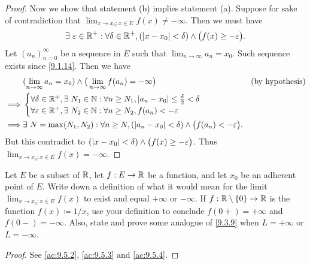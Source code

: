 \begin{proof}
  Now we show that statement (b) implies statement (a).
  Suppose for sake of contradiction that \(\lim_{x \to x_0 ; x \in E} f(x) \neq -\infty\).
  Then we must have
  \[
    \exists\ \varepsilon \in \mathbb{R}^+ : \forall \delta \in \mathbb{R}^+, (\left\lvert x - x_0\right\rvert < \delta) \land \big(f(x) \geq -\varepsilon\big).
  \]
  Let \((a_n)_{n = 0}^\infty\) be a sequence in \(E\) such that \(\lim_{n \to \infty} a_n = x_0\).
  Such sequence exists since \cref{9.1.14}.
  Then we have
  \begin{align*}
             & (\lim_{n \to \infty} a_n = x_0) \land \big(\lim_{n \to \infty} f(a_n) = -\infty\big)                                 & \text{(by hypothesis)} \\
    \implies & \begin{cases}
                 \forall \delta \in \mathbb{R}^+, \exists\ N_1 \in \mathbb{N} : \forall n \geq N_1, \left\lvert a_n - x_0\right\rvert \leq \frac{\delta}{2} < \delta \\
                 \forall \varepsilon \in \mathbb{R}^+, \exists\ N_2 \in \mathbb{N} : \forall n \geq N_2, f(a_n) < -\varepsilon
               \end{cases}                             \\
    \implies & \exists\ N = \max(N_1, N_2) : \forall n \geq N, (\left\lvert a_n - x_0\right\rvert < \delta) \land \big(f(a_n) < -\varepsilon\big).
  \end{align*}
  But this contradict to \((\left\lvert x - x_0\right\rvert < \delta) \land \big(f(x) \geq -\varepsilon\big)\).
  Thus \(\lim_{x \to x_0 ; x \in E} f(x) = -\infty\).
\end{proof}

\exercisesection

\begin{ex}\label{ex:9.5.1}
  Let \(E\) be a subset of \(\mathbb{R}\), let \(f : E \to \mathbb{R}\) be a function, and let \(x_0\) be an adherent point of \(E\).
  Write down a definition of what it would mean for the limit \(\lim_{x \to x_0 ; x \in E} f(x)\) to exist and equal \(+\infty\) or \(-\infty\).
  If \(f : \mathbb{R} \setminus \{0\} \to \mathbb{R}\) is the function \(f(x) \coloneqq 1 / x\), use your definition to conclude \(f(0+) = +\infty\) and \(f(0-) = -\infty\).
  Also, state and prove some analogue of \cref{9.3.9} when \(L = +\infty\) or \(L = -\infty\).
\end{ex}

\begin{proof}
  See \cref{ac:9.5.2}, \cref{ac:9.5.3} and \cref{ac:9.5.4}.
\end{proof}